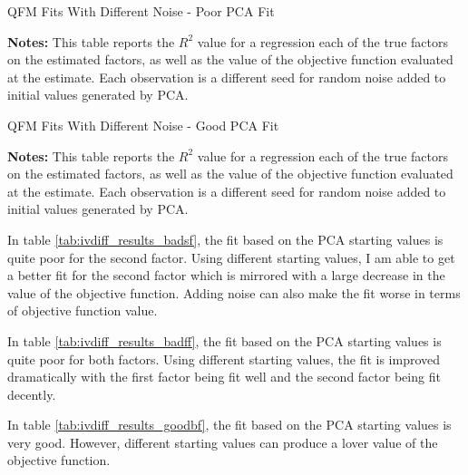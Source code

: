 \documentclass[12pt]{article}
\begin{document}
\begin{table}[ht]
    \begin{center}
        \caption{QFM Fits With Different Noise - Poor PCA Fit}
        \label{tab:ivdiff_results_badff}
        \scalebox{0.8}{
            
        }
    \end{center}
    {\small \begin{singlespace} \textbf{Notes:} This table reports the $R^2$ value for a regression each of the true factors on the estimated factors, as well as the value of the objective function evaluated at the estimate. Each observation is a different seed for random noise added to initial values generated by PCA.\end{singlespace}}
\end{table}

\begin{table}[ht]
    \begin{center}
        \caption{QFM Fits With Different Noise - Good PCA Fit}
        \label{tab:ivdiff_results_goodbf}
        \scalebox{0.8}{
            
        }
    \end{center}
    {\small \begin{singlespace} \textbf{Notes:} This table reports the $R^2$ value for a regression each of the true factors on the estimated factors, as well as the value of the objective function evaluated at the estimate. Each observation is a different seed for random noise added to initial values generated by PCA.\end{singlespace}}
\end{table}

In table \ref{tab:ivdiff_results_badsf}, the fit based on the PCA starting values is quite poor for the second factor. Using different starting values, I am able to get a better fit for the second factor which is mirrored with a large decrease in the value of the objective function. Adding noise can also make the fit worse in terms of objective function value. 

In table \ref{tab:ivdiff_results_badff}, the fit based on the PCA starting values is quite poor for both factors. Using different starting values, the fit is improved dramatically with the first factor being fit well and the second factor being fit decently. 

In table \ref{tab:ivdiff_results_goodbf}, the fit based on the PCA starting values is very good. However, different starting values can produce a lover value of the objective function. 
\end{document}
